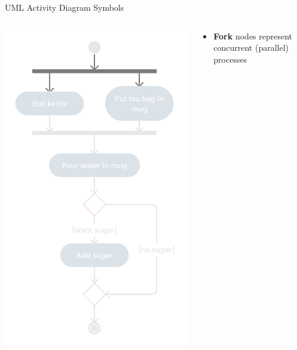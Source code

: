\begin{frame}{UML Activity Diagram Symbols}
	\begin{columns}
		\begin{column}{0.4\textwidth}
			\includegraphics[width=\textwidth]{ad_fork}
		\end{column}
		\begin{column}{0.58\textwidth}
			\begin{itemize}
				\pause\item \textbf{Fork} nodes represent concurrent (parallel) processes
			\end{itemize}
		\end{column}
	\end{columns}
\end{frame}

